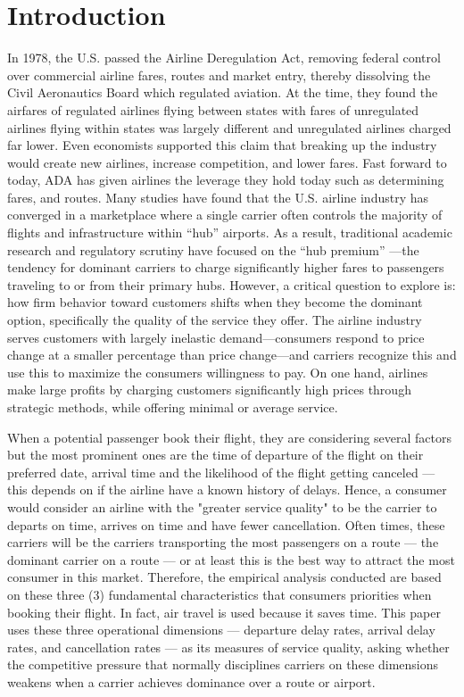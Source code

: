 \documentclass[preprint,12pt,authoryear]{elsarticle}
\begin{document}
\doublespacing 

\section{Introduction}
\label{sec:intro}
In 1978, the U.S. passed the Airline Deregulation Act, removing federal control over commercial airline fares, routes and market entry, thereby dissolving the Civil Aeronautics Board which regulated aviation. At the time, they found the airfares of regulated airlines flying between states with fares of unregulated airlines flying within states was largely different and unregulated airlines charged far lower. Even economists supported this claim that breaking up the industry would create new airlines, increase competition, and lower fares. Fast forward to today, ADA has given airlines the leverage they hold today such as determining fares, and routes. 
Many studies have found that the U.S. airline industry has converged in a marketplace where a single carrier often controls the majority of flights and infrastructure within “hub” airports. As a result, traditional academic research and regulatory scrutiny have focused on the “hub premium” —the tendency for dominant carriers to charge significantly higher fares to passengers traveling to or from their primary hubs. However, a critical question to explore is: how firm behavior toward customers shifts when they become the dominant option, specifically the quality of the service they offer. The airline industry serves customers with largely inelastic demand—consumers respond to price change at a smaller percentage than price change—and carriers recognize this and use this to maximize the consumers willingness to pay.  On one hand, airlines make large profits by charging customers significantly high prices through strategic methods, while offering minimal or average service. 

When a potential passenger book their flight, they are considering several factors but the most prominent ones are the time of departure of the flight on their preferred date, arrival time and the likelihood of the flight getting canceled --- this depends on if the airline have a known history of delays. Hence, a consumer would consider an airline with the "greater service quality" to be the carrier to departs on time, arrives on time and have fewer cancellation. Often times, these carriers will be the carriers transporting the most passengers on a route --- the dominant carrier on a route --- or at least this is the best way to attract the most consumer in this market. Therefore, the empirical analysis conducted are based on these three (3) fundamental characteristics that consumers priorities when booking their flight. In fact, air travel is used because it saves time. This paper uses these three operational dimensions — departure delay rates, arrival delay rates, and cancellation rates — as its measures of service quality, asking whether the competitive pressure that normally disciplines carriers on these dimensions weakens when a carrier achieves dominance over a route or airport.
	
\end{document}
